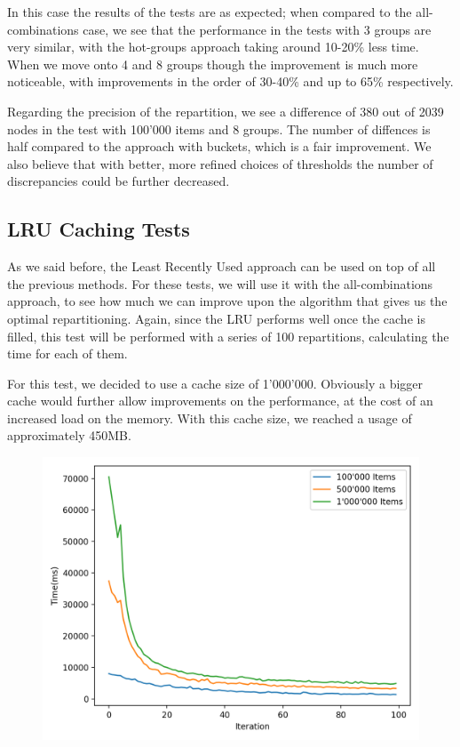 In this case the results of the tests are as expected; when compared to the all-combinations case, we see that the performance in the tests with 3 groups are very similar, with the hot-groups approach taking around 10-20\% less time. When we move onto 4 and 8 groups though the improvement is much more noticeable, with improvements in the order of 30-40\% and up to 65\% respectively.

Regarding the precision of the repartition, we see a difference of 380 out of 2039 nodes in the test with 100'000 items and 8 groups. The number of diffences is half compared to the approach with buckets, which is a fair improvement. We also believe that with better, more refined choices of thresholds the number of discrepancies could be further decreased.

\subsection{LRU Caching Tests}\label{sec:lru-caching-tests}
As we said before, the Least Recently Used approach can be used on top of all the previous methods. For these tests, we will use it with the all-combinations approach, to see how much we can improve upon the algorithm that gives us the optimal repartitioning. Again, since the LRU performs well once the cache is filled, this test will be performed with a series of 100 repartitions, calculating the time for each of them.

For this test, we decided to use a cache size of 1'000'000. Obviously a bigger cache would further allow improvements on the performance, at the cost of an increased load on the memory. With this cache size, we reached a usage of approximately 450MB.

\begin{figure}[!htb]
  \centering
  \includegraphics[width=\textwidth,height=\textheight,keepaspectratio]{img/LRU_8.png}
  \caption[caption]{ }
  \label{fig:LRU_8}
\end{figure}

